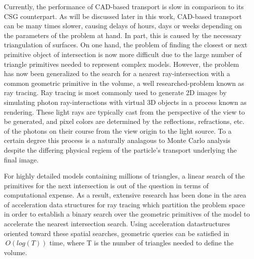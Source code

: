 \documentclass[12pt, a4paper]{article}
\begin{document}
Currently, the performance of CAD-based transport is slow in comparison to its CSG counterpart. As will be discussed later in this work, CAD-based transport can be many times slower, causing delays of hours, days or weeks depending on the parameters of the problem at hand. In part, this is caused by the necessary triangulation of surfaces. On one hand, the problem of finding the closest or next primitive object of intersection is now more difficult due to the large number of triangle primitives needed to represent complex models. However, the problem has now been generalized to the search for a nearest ray-intersection with a common geometric primitive in the volume, a well researched-problem known as ray tracing. Ray tracing is most commonly used to generate 2D images by simulating photon ray-interactions with virtual 3D objects in a process known as rendering. These light rays are typically cast from the perspective of the view to be generated, and pixel colors are determined by the reflections, refractions, etc. of the photons on their course from the view origin to the light source. To a certain degree this process is a naturally analagous to Monte Carlo analysis despite the differing physical regiem of the particle's transport underlying the final image.  For highly detailed models containing millions of triangles, a linear search of the primitives for the next intersection is out of the question in terms of computational expense. As a result, extensive research has been done in the area of acceleration data structures for ray tracing which partition the problem space in order to establish a binary search over the geometric primitives of the model to accelerate the nearest intersection search. Using acceleration datastructures oriented toward these spatial searches, geometric queries can be satisfied in $~O(log(T))$ time, where T is the number of triangles needed to define the volume.
\end{document}
